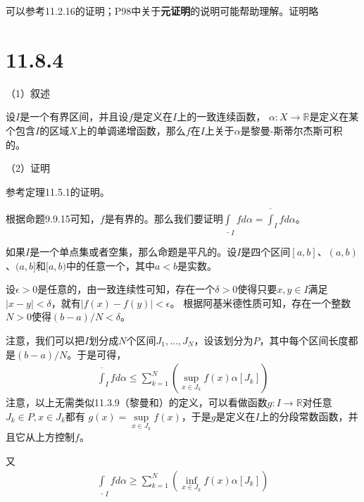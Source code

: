 \documentclass{article}
\begin{document}
        可以参考11.2.16的证明；P98中关于\textbf{元证明}的说明可能帮助理解。证明略

        \section*{11.8.4}
        （1）叙述

        设$I$是一个有界区间，并且设$f$是定义在$I$上的一致连续函数，
      $\alpha: X \to \mathbb{R}$是定义在某个包含$I$的区域$X$上的单调递增函数，那么$f$在$I$上关于$\alpha$是黎曼-斯蒂尔杰斯可积的。

        （2）证明

        参考定理11.5.1的证明。

        根据命题9.9.15可知，$f$是有界的。那么我们要证明$\underline{\int}_{I} f d\alpha = \overline{\int}_{I} f d\alpha$。

        如果$I$是一个单点集或者空集，那么命题是平凡的。设$I$是四个区间$[a,b]$、$(a,b)$、$(a, b]$和$[a, b)$中的任意一个，其中$a < b$是实数。

设$\epsilon > 0$是任意的，由一致连续性可知，存在一个$\delta > 0$使得只要$x, y \in I$满足$|x - y| < \delta$，就有$|f(x) - f(y)| < \epsilon$。
根据阿基米德性质可知，存在一个整数$N > 0$使得$(b - a)/N < \delta$。

注意，我们可以把$I$划分成$N$个区间$J_1,...,J_N$，设该划分为$P$，其中每个区间长度都是$(b-a)/N$。于是可得，
\begin{align*}
  \overline{\int}_{I} f d\alpha \leq \sum\limits_{k=1}^{N}\left(\sup\limits_{x \in J_k}f(x) \alpha[J_k] \right)
\end{align*}
注意，以上无需类似11.3.9（黎曼和）的定义，可以看做函数$g: I \to \mathbb{R}$对任意$J_k \in P, x \in J_k$都有
$g(x) = \sup\limits_{x \in J_k}f(x)$，于是$g$是定义在$I$上的分段常数函数，并且它从上方控制$f$。

又
\begin{align*}
  \underline{\int}_{I} f d\alpha \geq \sum\limits_{k=1}^{N}\left(\inf\limits_{x \in J_k}f(x) \alpha[J_k] \right)
\end{align*}
\end{document}
